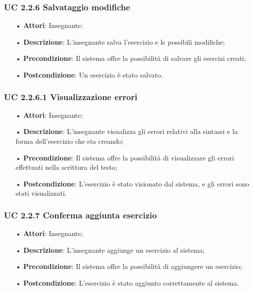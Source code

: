 \subsubsection{UC 2.2.6 Salvataggio modifiche}
\begin{itemize}
	\item[•] \textbf{Attori}: Insegnante;
	\item[•] \textbf{Descrizione}: L'insegnante salva l'esercizio e le possibili modifiche;
	\item[•] \textbf{Precondizione}: Il sistema offre la possibilità di salvare gli esercizi creati;
	\item[•] \textbf{Postcondizione}: Un esercizio è stato salvato.
\end{itemize}
\subsubsection{UC 2.2.6.1 Visualizzazione errori}
\begin{itemize}
	\item[•] \textbf{Attori}: Insegnante;
	\item[•] \textbf{Descrizione}: L'insegnante visualizza gli errori relativi alla sintassi e la forma dell’esercizio che sta creando;
	\item[•] \textbf{Precondizione}: Il sistema offre la possibilità di visualizzare gli errori effettuati nella scrittura del testo;
	\item[•] \textbf{Postcondizione}: L’esercizio è stato visionato dal sistema, e gli errori sono stati visualizzati.
\end{itemize}

\subsubsection{UC 2.2.7 Conferma aggiunta esercizio}
\begin{itemize}
	\item[•] \textbf{Attori}: Insegnante;
	\item[•] \textbf{Descrizione}: L'insegnante aggiunge un esercizio al sistema;
	\item[•] \textbf{Precondizione}: Il sistema offre la possibilità di aggiungere un esercizio;
	\item[•] \textbf{Postcondizione}: L’esercizio è stato aggiunto correttamente al sistema.
\end{itemize}

